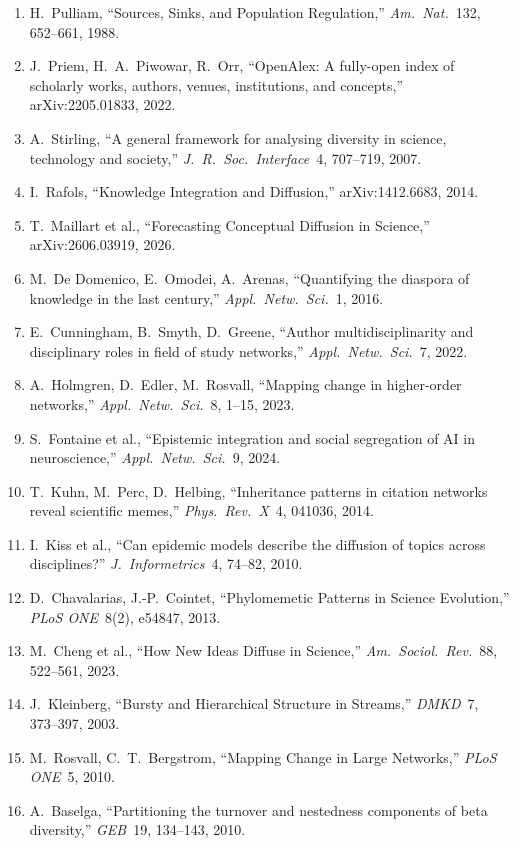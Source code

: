\documentclass[11pt,letterpaper]{article}
\begin{document}
\begin{enumerate}
\setlength{\itemsep}{0pt}
\item H.\ Pulliam, ``Sources, Sinks, and Population Regulation,'' \emph{Am.\ Nat.}\ 132, 652--661, 1988.
\item J.\ Priem, H.\ A.\ Piwowar, R.\ Orr, ``OpenAlex: A fully-open index of scholarly works, authors, venues, institutions, and concepts,'' arXiv:2205.01833, 2022.
\item A.\ Stirling, ``A general framework for analysing diversity in science, technology and society,'' \emph{J.\ R.\ Soc.\ Interface}\ 4, 707--719, 2007.
\item I.\ Rafols, ``Knowledge Integration and Diffusion,'' arXiv:1412.6683, 2014.
\item T.\ Maillart et al., ``Forecasting Conceptual Diffusion in Science,'' arXiv:2606.03919, 2026.
\item M.\ De Domenico, E.\ Omodei, A.\ Arenas, ``Quantifying the diaspora of knowledge in the last century,'' \emph{Appl.\ Netw.\ Sci.}\ 1, 2016.
\item E.\ Cunningham, B.\ Smyth, D.\ Greene, ``Author multidisciplinarity and disciplinary roles in field of study networks,'' \emph{Appl.\ Netw.\ Sci.}\ 7, 2022.
\item A.\ Holmgren, D.\ Edler, M.\ Rosvall, ``Mapping change in higher-order networks,'' \emph{Appl.\ Netw.\ Sci.}\ 8, 1--15, 2023.
\item S.\ Fontaine et al., ``Epistemic integration and social segregation of AI in neuroscience,'' \emph{Appl.\ Netw.\ Sci.}\ 9, 2024.
\item T.\ Kuhn, M.\ Perc, D.\ Helbing, ``Inheritance patterns in citation networks reveal scientific memes,'' \emph{Phys.\ Rev.\ X}\ 4, 041036, 2014.
\item I.\ Kiss et al., ``Can epidemic models describe the diffusion of topics across disciplines?'' \emph{J.\ Informetrics}\ 4, 74--82, 2010.
\item D.\ Chavalarias, J.-P.\ Cointet, ``Phylomemetic Patterns in Science Evolution,'' \emph{PLoS ONE}\ 8(2), e54847, 2013.
\item M.\ Cheng et al., ``How New Ideas Diffuse in Science,'' \emph{Am.\ Sociol.\ Rev.}\ 88, 522--561, 2023.
\item J.\ Kleinberg, ``Bursty and Hierarchical Structure in Streams,'' \emph{DMKD}\ 7, 373--397, 2003.
\item M.\ Rosvall, C.\ T.\ Bergstrom, ``Mapping Change in Large Networks,'' \emph{PLoS ONE}\ 5, 2010.
\item A.\ Baselga, ``Partitioning the turnover and nestedness components of beta diversity,'' \emph{GEB}\ 19, 134--143, 2010.

\end{enumerate}
\end{document}
